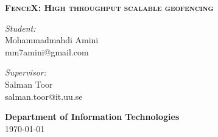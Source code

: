 \documentclass[a4]{report}
\begin{document}
\begin{titlepage}
            \noindent\makebox[\linewidth]{\rule{\linewidth}{1.2pt}}
            \textsc{ \textbf{\large FenceX: High throughput scalable geofencing }}
            \noindent\makebox[\linewidth]{\rule{\linewidth}{1.2pt}}

            \vspace{0.5in}

            \begin{minipage}{0.48\textwidth}
                \begin{flushleft}
                    \textit{Student:} \\
                    Mohammadmahdi Amini \\
                    mm7amini@gmail.com
                \end{flushleft}
            \end{minipage}
            \begin{minipage}{0.48\textwidth}
                \begin{flushright}
                    \textit{Supervisor:} \\
                    Salman Toor \\
                    salman.toor@it.uu.se
                \end{flushright}
            \end{minipage}

            \vspace{2in}

            \textbf{\large Department of Information Technologies} \\

            \today

        \end{titlepage}

        \null\newpage
        \setcounter{page}{2}
\end{document}
